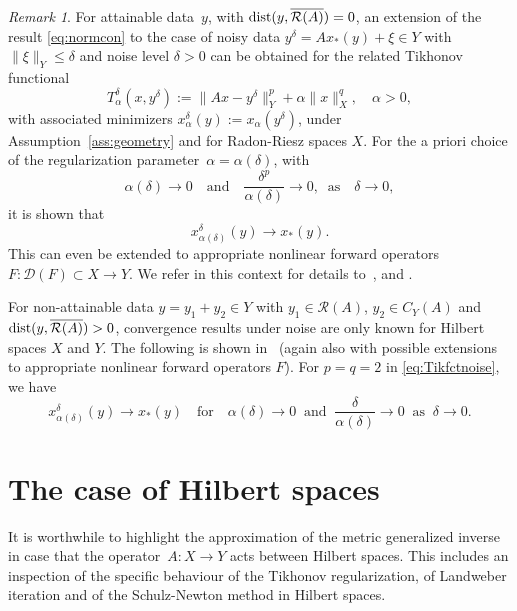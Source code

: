 \documentclass[12pt]{amsart}
\newcommand{\domain}{\mathcal D}
\newcommand{\range}{\mathcal R}
\theoremstyle{remark}
\newtheorem{remark}{Remark}
\begin{document}
\begin{remark} \label{rem:Tiknoise}
For attainable data~$y$, with ${\rm dist}(y,\overline{\range(A)})=0$, an extension of the result \eqref{eq:normcon} to the case of noisy data $y^\delta=Ax_*(y)+\xi \in Y$ with $\|\xi\|_Y \le \delta$
and noise level $\delta>0$ can be obtained for the related Tikhonov functional
\begin{equation} \label{eq:Tikfctnoise}
T^\delta_\alpha(x,y^\delta):=\|Ax-y^\delta\|_Y^p+\alpha \|x\|_X^q, \quad \alpha>0,
\end{equation}
with associated minimizers $x_\alpha^\delta(y):= x_\alpha(y^\delta)$, under Assumption~\ref{ass:geometry} and for Radon-Riesz spaces $X$.
For the a priori choice of the regularization parameter~$\alpha=\alpha(\delta)$, with
$$ \alpha(\delta) \to 0 \quad \mbox{and} \quad \frac{\delta^p}{\alpha(\delta)}\to 0, \;\; \mbox{as} \quad \delta \to 0,
$$
it is shown that 
$$
x^\delta_{\alpha(\delta)}(y) \to x_*(y).
$$
This can even be extended to appropriate nonlinear forward operators $F:\domain(F) \subset X \to Y$. We refer in this context for details to~\cite[Theorem~3.5]{HKPS07}, 
\cite[Theorem~3.26]{Scherzerbuch09} and \cite[Corollary~4.6]{MR2963507}.

\par
For non-attainable data $y=y_1+y_2 \in Y$ with $y_1 \in \range(A)$, $y_2 \in C_Y(A)$ and ${\rm dist}(y,\overline{\range(A)})>0$, convergence results under noise are only known for Hilbert spaces $X$ and $Y$. The following is shown in~\cite[Theorem~3.5]{Binder94} (again also with possible extensions to appropriate nonlinear forward operators $F$).
For $p=q=2$ in \eqref{eq:Tikfctnoise}, we have
\begin{equation} \label{eq:convnoiseHilbert} x^\delta_{\alpha(\delta)}(y) \to x_*(y)  \quad \mbox{for}\quad \alpha(\delta) \to 0 \;\; \mbox{and} \;\; \frac{\delta}{\alpha(\delta)}\to 0 \;\; \mbox{as} \;\; \delta \to 0 .
\end{equation} 
\end{remark}


\section{The case of Hilbert spaces} \label{sec:discussion}
It is worthwhile to highlight the approximation of the metric generalized inverse in case that the operator~$A\colon X \to Y$  acts between Hilbert spaces.
This
includes an inspection of the specific behaviour of the Tikhonov regularization, of Landweber iteration and of the Schulz-Newton method in Hilbert spaces. 
\end{document}
